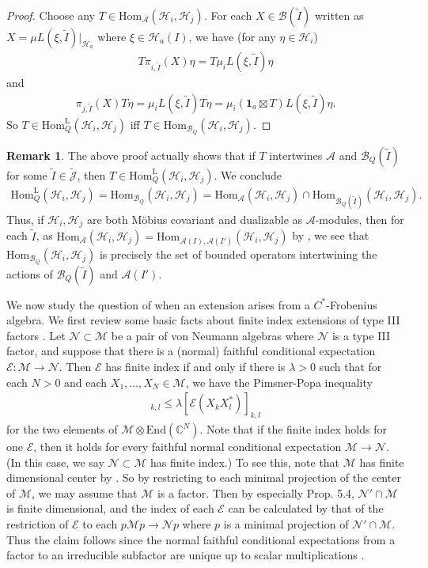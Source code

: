 \documentclass[12pt,a4paper,notitlepage]{article}
\theoremstyle{definition}
\newtheorem{rem}[df]{Remark}
\theoremstyle{plain}
\newcommand{\mc}{\mathcal}
\newcommand{\wtd}{\widetilde}
\newcommand{\End}{\mathrm{End}} %
\newcommand{\id}{\mathbf{1}}
\newcommand{\Hom}{\mathrm{Hom}}
\newcommand{\Jtd}{\widetilde{\mathcal J}}
\newcommand{\HomL}{\mathrm{Hom}^{\mathrm{L}}}
\newcommand{\Cbb}{\mathbb C}
\numberwithin{equation}{section}
\begin{document}
\begin{proof}
Choose any $T\in\Hom_{\mc A}(\mc H_i,\mc H_j)$. For each $X\in\mc B(\wtd I)$ written as $X=\mu L(\xi,\wtd I)|_{\mc H_a}$ where $\xi\in\mc H_a(I)$, we have (for any $\eta\in\mc H_i$)
\begin{align*}
T\pi_{i,\wtd I}(X)\eta=T\mu_i L(\xi,\wtd I)\eta	
\end{align*}
and
\begin{align*}
\pi_{j,\wtd I}(X)T\eta=\mu_i L(\xi,\wtd I)T\eta=\mu_i(\id_a\boxtimes T)L(\xi,\wtd I)\eta.
\end{align*}
So $T\in\HomL_Q(\mc H_i,\mc H_j)$ iff $T\in\Hom_{\mc B_Q}(\mc H_i,\mc H_j)$.
\end{proof}


\begin{rem}
The above proof actually shows that if $T$ intertwines $\mc A$ and $\mc B_Q(\wtd I)$ for some $\wtd I\in\Jtd$, then $T\in\HomL_Q(\mc H_i,\mc H_j)$. We conclude
\begin{align}
\HomL_Q(\mc H_i,\mc H_j)=\Hom_{\mc B_Q}(\mc H_i,\mc H_j)=\Hom_{\mc A}(\mc H_i,\mc H_j)\cap \Hom_{\mc B_Q(\wtd I)}(\mc H_i,\mc H_j).
\end{align}
Thus, if $\mc H_i,\mc H_j$ are both M\"obius covariant and dualizable as $\mc A$-modules, then for each $\wtd I$, as $\Hom_{\mc A}(\mc H_i,\mc H_j)=\Hom_{\mc A(I),\mc A(I')}(\mc H_i,\mc H_j)$ by \cite[Thm. 2.3]{GL96}, we see that $\Hom_{\mc B_Q}(\mc H_i,\mc H_j)$ is precisely the set of bounded operators intertwining the actions of $\mc B_Q(\wtd I)$ and $\mc A(I')$.
\end{rem}


We now study the question of when an extension arises from a $C^*$-Frobenius algebra. We first review some basic facts about finite index extensions of type III factors \cite{Lon89,Lon90,Kos98,BDH14}. Let $\mc N\subset\mc M$ be a pair of von Neumann algebras where $\mc N$ is a type III factor, and suppose that there is a (normal) faithful conditional expectation $\mc E:\mc M\rightarrow\mc N$. Then  $\mc E$ has finite index if and only if  there is $\lambda>0$ such that  for each $N>0$ and each $X_1,\dots,X_N\in\mc M$, we have the Pimsner-Popa inequality
\begin{align}
[X_k X_l^*]_{k,l}\leq \lambda [\mc E(X_k X_l^*)]_{k,l}	\label{eq13}
\end{align}
for the two elements of $\mc M\otimes\End(\Cbb^N)$. Note that if the finite index holds for one $\mc E$, then it holds for every faithful normal conditional expectation $\mc M\rightarrow\mc N$. (In this case, we say $\mc N\subset\mc M$ has finite index.) To see this, note that $\mc M$ has finite dimensional center by  \cite[Prop. 7.20]{BDH14}. So by restricting to each minimal projection of the center of $\mc M$, we may assume that $\mc M$ is a factor. Then by \cite{Lon89} especially Prop. 5.4, $\mc N'\cap \mc M$ is finite dimensional, and the index of each $\mc E$ can be calculated by that of the restriction of $\mc E$ to each $p\mc M p\rightarrow\mc N p$ where $p$ is a minimal projection of $\mc N'\cap \mc M$. Thus the claim follows since the normal faithful conditional expectations from a factor to an irreducible subfactor are unique up to scalar multiplications \cite{Kos98}.
\end{document}
